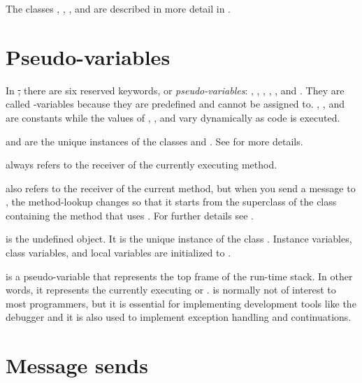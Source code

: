 \documentclass[a4paper,10pt,twoside]{book}
\begin{document}
The classes , , , and  are described in more detail in .


\section{Pseudo-variables}

In \st, there are six reserved keywords, or \emph{pseudo-variables}:
, , , , , and .
They are called -variables because they are predefined and cannot be assigned to.
, , and  are constants while the values of , , and  vary dynamically as code is executed.

 and  are the unique instances of the  classes  and .
See  for more details.

 always refers to the receiver of the currently executing method.

 also refers to the receiver of the current method, but when you send a message to \super, the method-lookup changes so that it starts from the superclass of the class containing the method that uses .
For further details see .

 is the undefined object.
It is the unique instance of the class . 
Instance variables, class variables, and local variables are initialized to .

 is a pseudo-variable that represents the top frame of the run-time stack.
In other words, it represents the currently executing  or .
 is normally not of interest to most programmers, but it is essential for implementing development tools like the debugger and it is also used to implement exception handling and continuations.

\section{Message sends}
\end{document}
